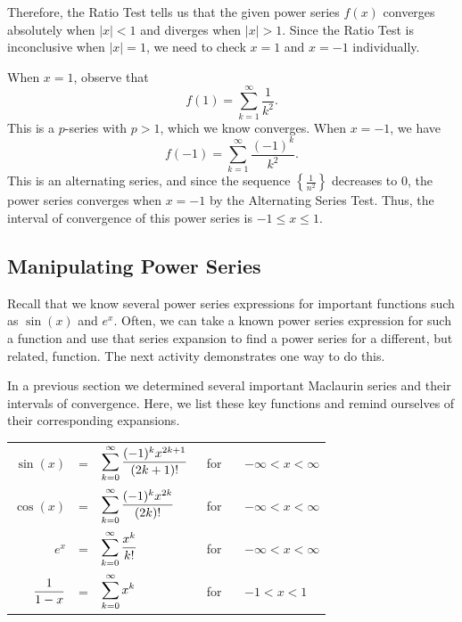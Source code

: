 Therefore, the Ratio Test tells us that the given power series $f(x)$ converges absolutely when $| x | < 1$ and diverges when $| x | > 1$.  Since the Ratio Test is inconclusive when $|x| = 1$, we need to check $x = 1$ and $x = -1$ individually.

When $x = 1$, observe that
\[f(1) = \sum_{k=1}^{\infty} \frac{1}{k^2}.\]
This is a $p$-series with $p > 1$, which we know converges.  When $x = -1$, we have
\[f(-1) = \sum_{k=1}^{\infty} \frac{(-1)^k}{k^2}.\]
This is an alternating series, and since the sequence $\left\{ \frac{1}{n^2} \right\}$ decreases to 0, the power series converges when $x=-1$ by the Alternating Series Test.  Thus, the interval of convergence of this power series is $-1 \le x \le 1$.

\afterex



\subsection*{Manipulating Power Series}
Recall that we know several power series expressions for important functions such as $\sin(x)$ and $e^x$.  Often, we can take a known power series expression for such a function and use that series expansion to find a power series for a different, but related, function.   The next activity demonstrates one way to do this.



In a previous section we determined several important Maclaurin series and their intervals of convergence.  Here, we list these key functions and remind ourselves of their corresponding expansions.

\begin{center}
\begin{tabular}{rclcl}
$\sin(x)$ & = & $\displaystyle \sum_{k=0}^{\infty} \frac{(-1)^k x^{2k+1}}{(2k+1)!}$ & \ \mbox{for} \ & $-\infty < x < \infty$ \\
$\cos(x)$ & = & $\displaystyle \sum_{k=0}^{\infty} \frac{(-1)^k x^{2k}}{(2k)!}$ & \ \mbox{for} \ & $-\infty < x < \infty$ \\
$e^x$ & = & $\displaystyle \sum_{k=0}^{\infty} \frac{x^{k}}{k!}$ & \ \mbox{for} \ & $-\infty < x < \infty$ \\
$\displaystyle \frac{1}{1-x}$ & = & $\displaystyle \sum_{k=0}^{\infty} x^k$ & \ \mbox{for} \ & $-1 < x < 1$ \\
\end{tabular}
\end{center}

